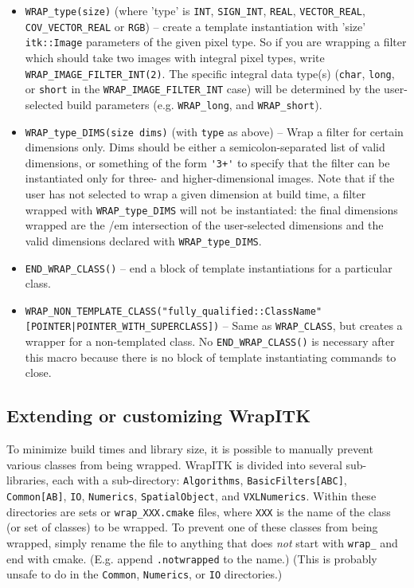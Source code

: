 \documentclass{InsightArticle}
\begin{document}
\begin{itemize}
  \item \verb$WRAP_type(size)$ (where 'type' is \verb$INT$, \verb$SIGN_INT$, \verb$REAL$, \verb$VECTOR_REAL$,
\verb$COV_VECTOR_REAL$ or \verb$RGB$) -- create a template instantiation with 'size'
\verb$itk::Image$ parameters of the given pixel type. So if you are wrapping a filter
which should take two images with integral pixel types, write \verb$WRAP_IMAGE_FILTER_INT(2)$. The
specific integral data type(s) (\verb$char$, \verb$long$, or \verb$short$ in the \verb$WRAP_IMAGE_FILTER_INT$ case) will
be determined by the user-selected build parameters (e.g. \verb$WRAP_long$, and
\verb$WRAP_short$). 

  \item \verb$WRAP_type_DIMS(size dims)$ (with \verb$type$ as above) -- Wrap a filter for certain
dimensions only. Dims should be either a semicolon-separated list of valid
dimensions, or something of the form \verb$'3+'$ to specify that the filter can be
instantiated only for three- and higher-dimensional images. Note that if the
user has not selected to wrap a given dimension at build time, a filter wrapped
with \verb$WRAP_type_DIMS$ will not be instantiated: the final dimensions wrapped are
the {/em intersection} of the user-selected dimensions and the valid dimensions
declared with \verb$WRAP_type_DIMS$.

  \item \verb$END_WRAP_CLASS()$ -- end a block of template instantiations for a particular
class.

  \item \verb$WRAP_NON_TEMPLATE_CLASS("fully_qualified::ClassName" [POINTER|POINTER_WITH_SUPERCLASS])$
 -- Same as \verb$WRAP_CLASS$, but creates a wrapper
for a non-templated class. No \verb$END_WRAP_CLASS()$ is necessary after this macro
because there is no block of template instantiating commands to close.
\end{itemize}


  \subsection{Extending or customizing WrapITK}

To minimize build times and library size, it is possible to manually prevent
various classes from being wrapped. WrapITK is divided into several
sub-libraries, each with a sub-directory: \verb$Algorithms$, \verb$BasicFilters[ABC]$,
\verb$Common[AB]$, \verb$IO$, \verb$Numerics$, \verb$SpatialObject$, and \verb$VXLNumerics$. Within these
directories are sets or \verb$wrap_XXX.cmake$ files, where \verb$XXX$ is the name of the class
(or set of classes) to be wrapped. To prevent one of these classes from being
wrapped, simply rename the file to anything that does {\em not} start with \verb$wrap_$ and
end with cmake. (E.g. append \verb$.notwrapped$ to the name.) (This is probably
unsafe to do in the \verb$Common$, \verb$Numerics$, or \verb$IO$ directories.)
\end{document}
